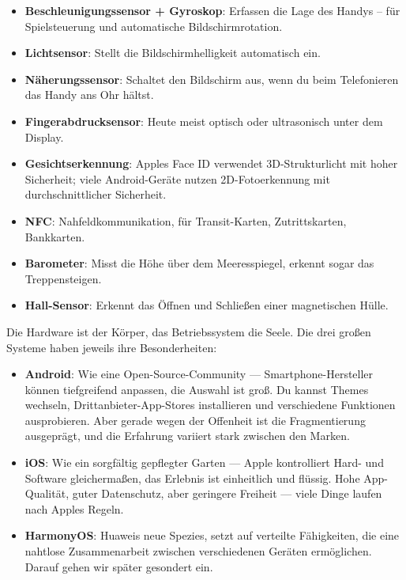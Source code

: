 \begin{itemize}
  \item \textbf{Beschleunigungssensor + Gyroskop}: Erfassen die Lage des Handys – für Spielsteuerung und automatische Bildschirmrotation.
  \item \textbf{Lichtsensor}: Stellt die Bildschirmhelligkeit automatisch ein.
  \item \textbf{Näherungssensor}: Schaltet den Bildschirm aus, wenn du beim Telefonieren das Handy ans Ohr hältst.
  \item \textbf{Fingerabdrucksensor}: Heute meist optisch oder ultrasonisch unter dem Display.
  \item \textbf{Gesichtserkennung}: Apples Face ID verwendet 3D-Strukturlicht mit hoher Sicherheit; viele Android-Geräte nutzen 2D-Fotoerkennung mit durchschnittlicher Sicherheit.
  \item \textbf{NFC}: Nahfeldkommunikation, für Transit-Karten, Zutrittskarten, Bankkarten.
  \item \textbf{Barometer}: Misst die Höhe über dem Meeresspiegel, erkennt sogar das Treppensteigen.
  \item \textbf{Hall-Sensor}: Erkennt das Öffnen und Schließen einer magnetischen Hülle.
\end{itemize}


Die Hardware ist der Körper, das Betriebssystem die Seele. Die drei großen Systeme haben jeweils ihre Besonderheiten:

\begin{itemize}
  \item \textbf{Android}: Wie eine Open-Source-Community — Smartphone-Hersteller können tiefgreifend anpassen, die Auswahl ist groß. Du kannst Themes wechseln, Drittanbieter-App-Stores installieren und verschiedene Funktionen ausprobieren. Aber gerade wegen der Offenheit ist die Fragmentierung ausgeprägt, und die Erfahrung variiert stark zwischen den Marken.
  \item \textbf{iOS}: Wie ein sorgfältig gepflegter Garten — Apple kontrolliert Hard- und Software gleichermaßen, das Erlebnis ist einheitlich und flüssig. Hohe App-Qualität, guter Datenschutz, aber geringere Freiheit — viele Dinge laufen nach Apples Regeln.
  \item \textbf{HarmonyOS}: Huaweis neue Spezies, setzt auf verteilte Fähigkeiten, die eine nahtlose Zusammenarbeit zwischen verschiedenen Geräten ermöglichen. Darauf gehen wir später gesondert ein.
\end{itemize}

